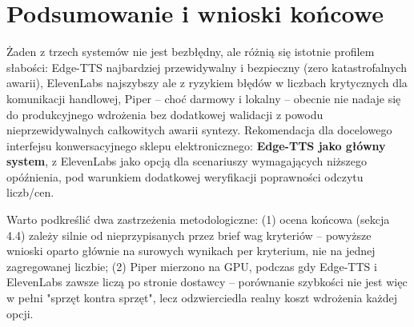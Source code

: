 \documentclass{article}
\begin{document}
\section{Podsumowanie i wnioski końcowe}
Żaden z trzech systemów nie jest bezbłędny, ale różnią się istotnie profilem słabości: Edge-TTS
najbardziej przewidywalny i bezpieczny (zero katastrofalnych awarii), ElevenLabs najszybszy ale
z ryzykiem błędów w liczbach krytycznych dla komunikacji handlowej, Piper -- choć darmowy i
lokalny -- obecnie nie nadaje się do produkcyjnego wdrożenia bez dodatkowej walidacji z powodu
nieprzewidywalnych całkowitych awarii syntezy. Rekomendacja dla docelowego interfejsu
konwersacyjnego sklepu elektronicznego: \textbf{Edge-TTS jako główny system}, z ElevenLabs jako
opcją dla scenariuszy wymagających niższego opóźnienia, pod warunkiem dodatkowej weryfikacji
poprawności odczytu liczb/cen.

Warto podkreślić dwa zastrzeżenia metodologiczne: (1) ocena końcowa (sekcja 4.4) zależy silnie
od nieprzypisanych przez brief wag kryteriów -- powyższe wnioski oparto głównie na surowych
wynikach per kryterium, nie na jednej zagregowanej liczbie; (2) Piper mierzono na GPU, podczas
gdy Edge-TTS i ElevenLabs zawsze liczą po stronie dostawcy -- porównanie szybkości nie jest
więc w pełni "sprzęt kontra sprzęt", lecz odzwierciedla realny koszt wdrożenia każdej opcji.
\end{document}
